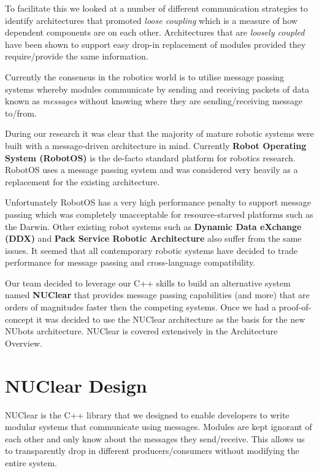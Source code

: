 \documentclass[english,12pt]{scrartcl}
\begin{document}
				To facilitate this we looked at a number of different communication strategies to identify architectures that promoted \emph{loose coupling} which is a measure of how dependent components are on each other. 
				Architectures that are \emph{loosely coupled} have been shown to support easy drop-in replacement of modules provided they require/provide the same information.
				 
				Currently the consensus in the robotics world is to utilise message passing systems whereby modules communicate by sending and receiving packets of data known as \emph{messages} without knowing where they are sending/receiving message to/from.
				
				During our research it was clear that the majority of mature robotic systems were built with a message-driven architecture in mind. 
				Currently \textbf{Robot Operating System (RobotOS)} is the de-facto standard platform for robotics research.
				RobotOS uses a message passing system and was considered very heavily as a replacement for the existing architecture.
				
				Unfortunately RobotOS has a very high performance penalty to support message passing which was completely unacceptable for resource-starved platforms such as the Darwin. 
				Other existing robot systems such as \textbf{Dynamic Data eXchange (DDX)} and \textbf{Pack Service Robotic Architecture} also suffer from the same issues. It seemed that all contemporary robotic systems have decided to trade performance for message passing and cross-language compatibility.
				
				Our team decided to leverage our C++ skills to build an alternative system named \textbf{NUClear} that provides message passing capabilities (and more) that are orders of magnitudes faster then the competing systems. 
				Once we had a proof-of-concept it was decided to use the NUClear architecture as the basis for the new NUbots architecture. NUClear is covered extensively in the Architecture Overview.
		
	\section{NUClear Design}
		NUClear is the C++ library that we designed to enable developers to write modular systems that communicate using messages. 
		Modules are kept ignorant of each other and only know about the messages they send/receive. 
		This allows us to transparently drop in different producers/consumers without modifying the entire system.
		
\end{document}
